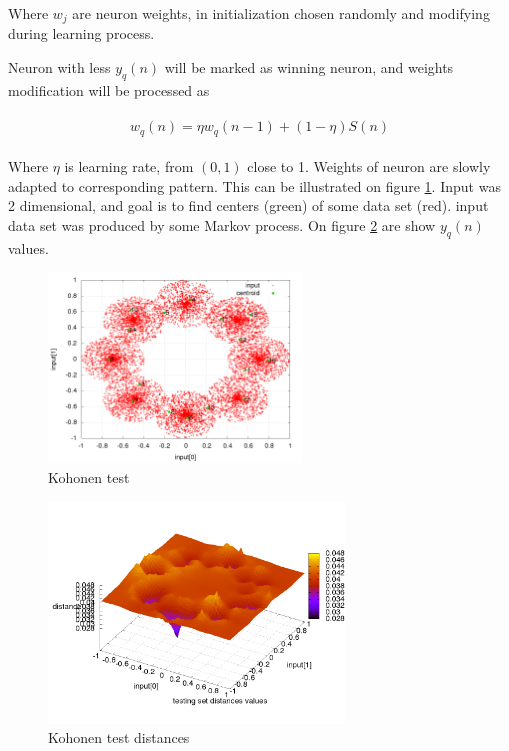 \documentclass[twoside]{oss-conf-eng}
\begin{document}
Where $w_j$ are neuron weights, in initialization chosen randomly
 and modifying during learning process.

Neuron with less $y_q(n)$ will be marked as winning neuron, and weights modification
will be processed as

\begin{eqnarray}
\begin{split}
\label{neuron_transfer}
w_q(n) = \eta w_q(n-1) + (1 - \eta)S(n)
\end{split}
\end{eqnarray}

Where $\eta$ is learning rate, from $(0, 1)$ close to 1. Weights of neuron are slowly adapted
to corresponding pattern. This can be illustrated on figure \ref{fig:kohonen_test_01}. Input was
2 dimensional, and goal is to find centers (green) of some data set (red). input
data set was produced by some Markov process. On figure \ref{fig:kohonen_test_02} are
show $y_q(n)$ values.

\begin{figure}[]
    \centering
    \includegraphics[width=0.6\textwidth]{kohonen_test/learing_result.png}
    \caption{Kohonen test}
    \label{fig:kohonen_test_01}
\end{figure}

\begin{figure}[]
    \centering
    \includegraphics[width=0.7\textwidth]{kohonen_test/distances_result.png}
    \caption{Kohonen test distances}
    \label{fig:kohonen_test_02}
\end{figure}
\end{document}
